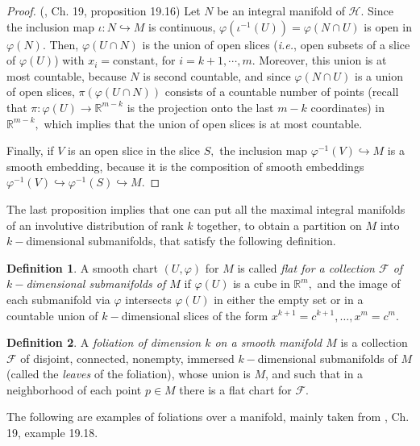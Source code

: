 \documentclass[12pt, letterpaper, reqno]{amsart}
\theoremstyle{definition}
\newtheorem{df}{Definition}
\theoremstyle{plain}
\theoremstyle{remark}
\begin{document}
\begin{proof}(\cite{lee2003introduction}, Ch. 19, proposition 19.16)
	Let $ N $ be an integral manifold of $ \mathcal{H}. $ Since the inclusion map $ \iota: N \hookrightarrow M $ is continuous, $ \varphi( \iota^{-1}(U))=\varphi(N\cap U) $  is open in $ \varphi(N) $. Then, $ \varphi(U\cap N) $ is the union of open slices (\textit{i.e.}, open subsets of a slice of $ \varphi(U)$) with $ x_i=\text{constant} $, for $ i=k+1,\cdots,m.$ Moreover, this union is at most countable, because $ N $ is second countable, and since $ \varphi(N\cap U) $ is a union of open slices, $ \pi(\varphi(U\cap N)) $ consists of a countable number of points (recall that $ \pi: \varphi(U) \rightarrow \mathbb{R}^{m-k} $ is the projection onto the last $ m-k $ coordinates) in $ \mathbb{R}^{m-k}, $ which implies that the union of open slices is at most countable.  

	Finally, if $ V $ is an open slice in the slice $ S, $ the inclusion map $ \varphi^{-1}(V) \hookrightarrow M $ is a smooth embedding, because it is the composition of smooth embeddings $ \varphi^{-1}(V)\hookrightarrow \varphi^{-1}(S) \hookrightarrow M.$ 
\end{proof}

The last proposition implies that one can put all the maximal integral manifolds of an involutive distribution of rank $ k $  together, to obtain a partition on $ M $ into $ k- $dimensional submanifolds, that satisfy the following definition.
\begin{df}
	A smooth chart $ (U,\varphi) $ for $ M $ is called \textit{flat for a collection $ \mathcal{F} $ of $ k- $dimensional submanifolds of $ M $} if $ \varphi(U) $ is a cube in $ \mathbb{R}^m, $ and the image of each submanifold via $ \varphi $ intersects $ \varphi(U) $ in either the empty set or in a countable union of $ k- $dimensional slices of the form $ x^{k+1}=c^{k+1},\dots,x^m=c^m. $   
\end{df}

\begin{df}
	A \textit{foliation of dimension $ k $ on a smooth manifold $ M $} is a collection $ \mathcal{F} $ of disjoint, connected, nonempty, immersed $ k- $dimensional submanifolds of $ M $ (called the \textit{leaves} of the foliation), whose union is $ M $, and such that in a neighborhood of each point $ p\in M $ there is a flat chart for $ \mathcal{F}. $  
\end{df}

The following are examples of foliations over a manifold, mainly taken from \cite{lee2003introduction}, Ch. 19, example 19.18.
\end{document}
